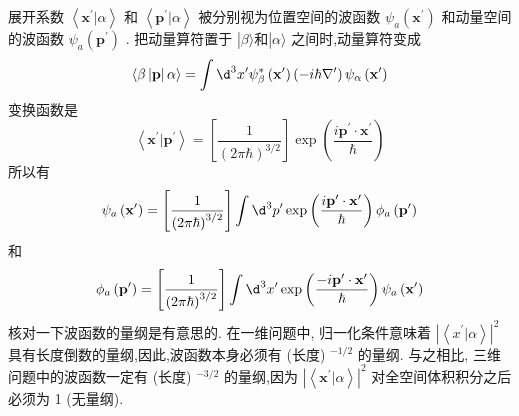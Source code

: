 \documentclass[lang=cn,newtx,10pt,scheme=chinese,thmcnt=section]{elegantbook}
\begin{document}
展开系数 $\left\langle {{\mathbf{x}}^{\prime } | \alpha }\right\rangle$ 和 $\left\langle {{\mathbf{p}}^{\prime } | \alpha }\right\rangle$ 被分别视为位置空间的波函数 ${\psi }_{a}\left( {\mathbf{x}}^{\prime }\right)$ 和动量空间的波函数 ${\psi }_{a}\left( {\mathbf{p}}^{\prime }\right)$ . 把动量算符置于 $\left| {\beta \rangle \text{和}}\right| \alpha \rangle$ 之间时,动量算符变成
\begin{equation}
	\langle \beta \left| \mathbf{p}\right| \alpha \rangle = \int {\d}^{3}{x}^{\prime }{\psi }_{\beta }^{ * }\left( {\mathbf{x}}^{\prime }\right) \left( {-i\hbar {\nabla }^{\prime }}\right) {\psi }_{\alpha }\left( {\mathbf{x}}^{\prime }\right)
\end{equation}
变换函数是
\begin{equation}
	\left\langle {{\mathbf{x}}^{\prime } | {\mathbf{p}}^{\prime }}\right\rangle = \left\lbrack \frac{1}{{\left( 2\pi \hbar \right) }^{3/2}}\right\rbrack \exp \left( \frac{i{\mathbf{p}}^{\prime } \cdot {\mathbf{x}}^{\prime }}{\hbar }\right)
\end{equation}
所以有
\begin{equation}
	{\psi }_{a}\left( {\mathbf{x}}^{\prime }\right) = \left\lbrack \frac{1}{{\left( 2\pi \hbar \right) }^{3/2}}\right\rbrack \int {\d}^{3}{p}^{\prime }\exp \left( \frac{i{\mathbf{p}}^{\prime } \cdot {\mathbf{x}}^{\prime }}{\hbar }\right) {\phi }_{a}\left( {\mathbf{p}}^{\prime }\right)
\end{equation}
和
\begin{equation}
	{\phi }_{a}\left( {\mathbf{p}}^{\prime }\right) = \left\lbrack \frac{1}{{\left( 2\pi \hbar \right) }^{3/2}}\right\rbrack \int {\d}^{3}{x}^{\prime }\exp \left( \frac{-i{\mathbf{p}}^{\prime } \cdot {\mathbf{x}}^{\prime }}{\hbar }\right) {\psi }_{a}\left( {\mathbf{x}}^{\prime }\right)
\end{equation}
核对一下波函数的量纲是有意思的. 在一维问题中, 归一化条件意味着 ${\left| \left\langle {x}^{\prime } | \alpha \right\rangle \right| }^{2}$ 具有长度倒数的量纲,因此,波函数本身必须有 (长度) ${}^{-1/2}$ 的量纲. 与之相比, 三维问题中的波函数一定有 (长度) ${}^{-3/2}$ 的量纲,因为 ${\left| \left\langle {\mathbf{x}}^{\prime } | \alpha \right\rangle \right| }^{2}$ 对全空间体积积分之后必须为 1 (无量纲).
\end{document}
